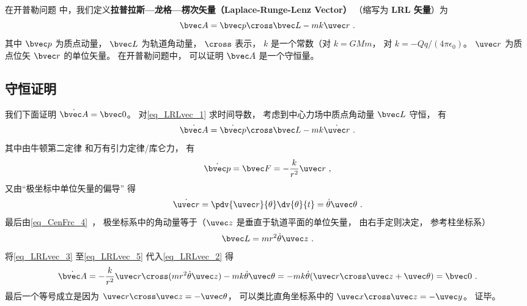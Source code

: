 

在开普勒问题%
中，我们定义\textbf{拉普拉斯—龙格—楞次矢量（Laplace-Runge-Lenz Vector）} （缩写为 \textbf{LRL 矢量}）为
\begin{equation}\label{eq_LRLvec_1}
\bvec A = \bvec p \cross \bvec L - mk \uvec r~.
\end{equation}
其中 $\bvec p$ 为质点动量， $\bvec L$ 为轨道角动量， $\cross$ 表示， $k$ 是一个常数（对 $k = GMm$， 对 $k = -Qq/(4\pi\epsilon_0)$。 $\uvec r$ 为质点位矢 $\bvec r$ 的单位矢量。 在开普勒问题中， 可以证明 $\bvec A$ 是一个守恒量。

\subsection{守恒证明}
我们下面证明 $\dot{\bvec A} = \bvec 0$。 对\autoref{eq_LRLvec_1} 求时间导数， 考虑到中心力场中质点角动量 $\bvec L$ 守恒， 有
\begin{equation}\label{eq_LRLvec_2}
\dot{\bvec A} = \dot{\bvec p}\cross \bvec L  - mk\dot{\uvec r}~.
\end{equation}
其中由牛顿第二定律 和万有引力定律/库仑力， 有
\begin{equation}\label{eq_LRLvec_3}
\dot{\bvec p} = \bvec F = - \frac{k}{r^2}\uvec r~,
\end{equation}
又由“极坐标中单位矢量的偏导” 得
\begin{equation}\label{eq_LRLvec_4}
\dot{\uvec r} = \pdv{\uvec r}{\theta} \dv{\theta}{t} = \dot\theta\uvec \theta~.
\end{equation}
最后由\autoref{eq_CenFrc_4}~， 极坐标系中的角动量等于（$\uvec z$ 是垂直于轨道平面的单位矢量， 由右手定则决定， 参考柱坐标系）
\begin{equation}\label{eq_LRLvec_5}
\bvec L = mr^2\dot \theta \uvec z~.
\end{equation}
将\autoref{eq_LRLvec_3} 至\autoref{eq_LRLvec_5} 代入\autoref{eq_LRLvec_2} 得
\begin{equation}
\dot{\bvec A} = -\frac{k}{r^2}\uvec r \cross (mr^2\dot\theta\uvec z) - mk\dot\theta\uvec\theta
=-mk\dot\theta (\uvec r\cross \uvec z + \uvec \theta)
= \bvec 0~.
\end{equation}
最后一个等号成立是因为 $\uvec r\cross\uvec z = -\uvec\theta$， 可以类比直角坐标系中的 $\uvec x\cross\uvec z = -\uvec y$。 证毕。

